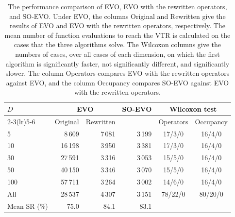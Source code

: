 \begin{table}[htbp]
\centering\small
\caption{The performance comparison of EVO, EVO with the rewritten operators, and SO-EVO. Under EVO, the columns Original and Rewritten give the results of EVO and EVO with the rewritten operators, respectively. The mean number of function evaluations to reach the VTR is calculated on the cases that the three algorithms solve. The Wilcoxon columns give the numbers of cases, over all cases of each dimension, on which the first algorithm is significantly faster, not significantly different, and significantly slower. The column Operators compares EVO with the rewritten operators against EVO, and the column Occupancy compares SO-EVO against EVO with the rewritten operators.}
\label{tab:opsablation}
\begin{tabular}{lrrrcc}
\toprule
$D$ & \multicolumn{2}{c}{EVO} & SO-EVO & \multicolumn{2}{c}{Wilcoxon test} \\
\cmidrule(lr){2-3}\cmidrule(lr){5-6}
 & Original & Rewritten & & Operators & Occupancy \\
\midrule
5 & 8\,609 & 7\,081 & 3\,199 & 17/3/0 & 16/4/0 \\
10 & 16\,198 & 3\,950 & 3\,381 & 17/3/0 & 16/4/0 \\
30 & 27\,591 & 3\,316 & 3\,053 & 15/5/0 & 16/4/0 \\
50 & 40\,150 & 3\,346 & 3\,070 & 15/5/0 & 16/4/0 \\
100 & 57\,711 & 3\,264 & 3\,002 & 14/6/0 & 16/4/0 \\
\midrule
All & 28\,537 & 4\,307 & 3\,151 & 78/22/0 & 80/20/0 \\
Mean SR (\%) & 75.0 & 84.1 & 83.1 & & \\
\bottomrule
\end{tabular}
\end{table}
